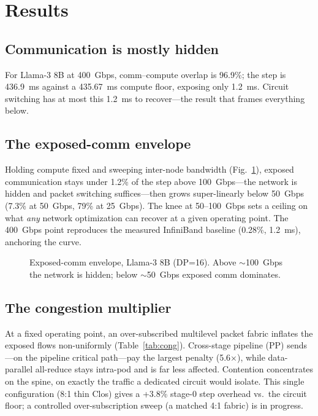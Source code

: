 \documentclass[conference]{IEEEtran}
\newcommand{\ppmult}{5.6}            %
\newcommand{\closoverhead}{3.8}      %
\begin{document}
\section{Results}
\subsection{Communication is mostly hidden}
For Llama-3 8B at 400~Gbps, comm--compute overlap is 96.9\%; the step is 436.9~ms against a
435.67~ms compute floor, exposing only 1.2~ms. Circuit switching has at most this 1.2~ms to
recover---the result that frames everything below.

\subsection{The exposed-comm envelope}
Holding compute fixed and sweeping inter-node bandwidth (Fig.~\ref{fig:envelope}), exposed
communication stays under 1.2\% of the step above 100~Gbps---the network is hidden and packet
switching suffices---then grows super-linearly below 50~Gbps (7.3\% at 50~Gbps, 79\% at
25~Gbps). The knee at 50--100~Gbps sets a ceiling on what \emph{any} network optimization can
recover at a given operating point. The 400~Gbps point reproduces the measured InfiniBand
baseline (0.28\%, 1.2~ms), anchoring the curve.

\begin{figure}[t]
\centering
{}
\caption{Exposed-comm envelope, Llama-3 8B (DP=16). Above $\sim$100~Gbps the network is hidden;
below $\sim$50~Gbps exposed comm dominates.}
\label{fig:envelope}
\end{figure}

\subsection{The congestion multiplier}
At a fixed operating point, an over-subscribed multilevel packet fabric inflates the exposed
flows non-uniformly (Table~\ref{tab:cong}). Cross-stage pipeline (PP) sends---on the pipeline
critical path---pay the largest penalty (\ppmult$\times$), while data-parallel all-reduce stays
intra-pod and is far less affected. Contention concentrates on the spine, on exactly the
traffic a dedicated circuit would isolate. This single configuration (8:1 thin Clos) gives a
+\closoverhead\% stage-0 step overhead vs.\ the circuit floor; a controlled
over-subscription sweep (a matched 4:1 fabric) is in progress.
\end{document}
